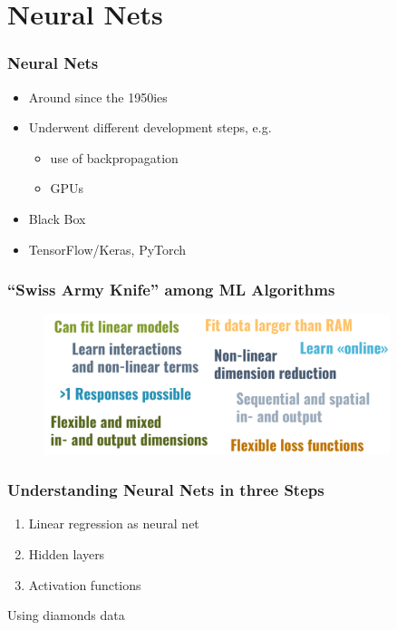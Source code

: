 \documentclass[
    utf8,
    aspectratio=169
]{beamer}  %
\begin{document}
\section{Neural Nets}

\begin{frame}
	\frametitle{Neural Nets}
	\begin{itemize}
		\item Around since the 1950ies
		\item Underwent different development steps, e.g.
		\begin{itemize}
			\item use of backpropagation
			\item GPUs
		\end{itemize}
		\item Black Box
		\item TensorFlow/Keras, PyTorch
	\end{itemize}
\end{frame}

\begin{frame}
	\frametitle{``Swiss Army Knife'' among ML Algorithms}
	\begin{figure}
		\includegraphics[width=0.9\textwidth]{pics/nn_knife.png}
	\end{figure}
\end{frame}

\begin{frame}
	\frametitle{Understanding Neural Nets in three Steps}
	\begin{enumerate}
		\item Linear regression as neural net
		\item Hidden layers
		\item Activation functions
	\end{enumerate}

	\vfill
	
	Using \alert{diamonds} data
\end{frame}
\end{document}
